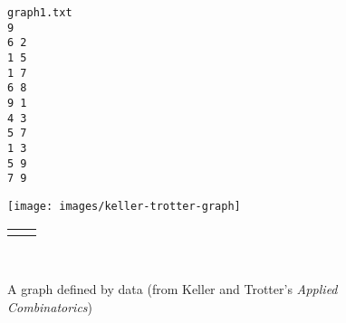 \documentclass[10pt,]{article}
\theoremstyle{plain}
\theoremstyle{definition}
\theoremstyle{definition}
\theoremstyle{definition}
\theoremstyle{definition}
\theoremstyle{definition}
\theoremstyle{definition}
\numberwithin{equation}{section}
\newlength{\panelmax}
\begin{document}
\begin{figure}
\centering
{%
\setlength{\panelmax}{0pt}
\ifdefined\panelboxApre\else\newsavebox{\panelboxApre}\fi%
\begin{lrbox}{\panelboxApre}
\begin{BVerbatim}[boxwidth=0.2\linewidth,baseline=b]
graph1.txt
9
6 2
1 5
1 7
6 8
9 1
4 3
5 7
1 3
5 9
7 9
\end{BVerbatim}
\end{lrbox}
\ifdefined\phApre\else\newlength{\phApre}\fi%
\setlength{\phApre}{\ht\panelboxApre+\dp\panelboxApre}
\settototalheight{\phApre}{\usebox{\panelboxApre}}
\setlength{\panelmax}{\maxof{\panelmax}{\phApre}}
\ifdefined\panelboxAimage\else\newsavebox{\panelboxAimage}\fi%
\begin{lrbox}{\panelboxAimage}
\texttt{[image: images/keller-trotter-graph]}
\end{lrbox}
\ifdefined\phAimage\else\newlength{\phAimage}\fi%
\setlength{\phAimage}{\ht\panelboxAimage+\dp\panelboxAimage}
\settototalheight{\phAimage}{\usebox{\panelboxAimage}}
\setlength{\panelmax}{\maxof{\panelmax}{\phAimage}}
\leavevmode%
\setlength{\tabcolsep}{0.05\linewidth}
\par\medskip\noindent
\hspace*{0.15\linewidth}%
\begin{tabular}{@{}*{2}{c}@{}}
\begin{minipage}[c][\panelmax][c]{0.2\linewidth}\usebox{\panelboxApre}\end{minipage}&
\begin{minipage}[c][\panelmax][c]{0.4\linewidth}\usebox{\panelboxAimage}\end{minipage}\end{tabular}\\
}%
\caption{A graph defined by data (from Keller and Trotter's \textsl{Applied Combinatorics})\label{figure-74}}
\end{figure}
\typeout{************************************************}
\typeout{************************************************}
\end{document}
